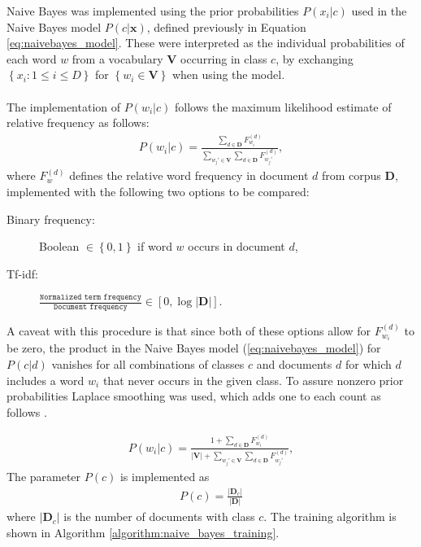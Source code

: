 
Naive Bayes was implemented using the prior probabilities $P(x_i\vert c)$ used in the Naive Bayes model $P(c\vert\mathbf{x})$, defined previously in Equation \ref{eq:naivebayes_model}. These were interpreted as the individual probabilities of each word $w$ from a vocabulary $\mathbf{V}$ occurring in class $c$, by exchanging $\left\{x_i : 1 \le i \le D\right\}$ for $\left\{w_i \in \mathbf{V}\right\}$ when using the model.
\\\\
The implementation of $P(w_i\vert c)$ follows the maximum likelihood estimate of relative frequency as follows:
\begin{align}
P(w_i\vert c) =
\frac
	{
		\sum_{d \in \mathbf{D}} F_{w_i}^{(d)}
	}
	{
		\sum_{w_j' \in \mathbf{V}} \sum_{d \in \mathbf{D}}  F_{w_j'}^{(d)}
	},
\end{align}
where $F_w^{(d)}$ defines the relative word frequency in document $d$ from corpus $\mathbf{D}$, implemented with the following two options to be compared:
\begin{description}
  \item[Binary frequency:] Boolean $\in \left\{0,1\right\}$ if word $w$ occurs in document $d$,
  \item[Tf-idf:] $\frac{\texttt{Normalized term frequency}}{\texttt{Document frequency}} \in \left[0, \log \left\vert \mathbf{D}\right\vert\right]$.
\end{description}
A caveat with this procedure is that since both of these options allow for $F_{w_i}^{(d)}$ to be zero, the product in the Naive Bayes model (\ref{eq:naivebayes_model}) for $P(c\vert d)$ vanishes for all combinations of classes $c$ and documents $d$ for which $d$ includes a word $w_i$ that never occurs in the given class. To assure nonzero prior probabilities Laplace smoothing was used, which adds one to each count as follows \citep{nb_ref}. 

\begin{align}
P(w_i\vert c) =
\frac
	{
		1 + \sum_{d \in \mathbf{D}} F_{w_i}^{(d)}
	}
	{
		\left\vert\mathbf{V}\right\vert + \sum_{w_j' \in \mathbf{V}} \sum_{d \in \mathbf{D}} F_{w_j'}^{(d)}
	},
\end{align}
The parameter $P(c)$ is implemented as
\begin{align}
P(c) = \frac{\left\vert\mathbf{D}_c\right\vert}{\left\vert\mathbf{D}\right\vert}
\end{align}
where $\left\vert\mathbf{D}_c\right\vert$ is the number of documents with class $c$. The training algorithm is shown in Algorithm \ref{algorithm:naive_bayes_training}.

